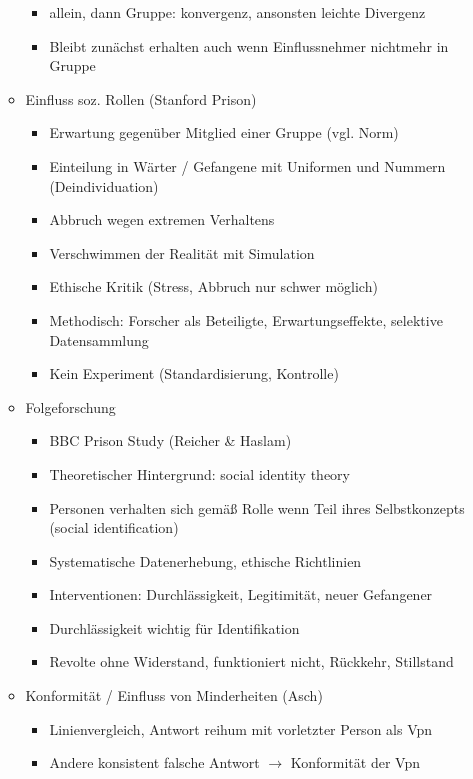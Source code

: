 \documentclass[11pt, paper=a4, twocolumn]{scrartcl}
\begin{document}
\begin{itemize}
\begin{itemize}
\begin{itemize}
							\item allein, dann Gruppe: konvergenz, ansonsten leichte Divergenz
							\item Bleibt zunächst erhalten auch wenn Einflussnehmer nichtmehr in Gruppe
						\end{itemize}
					\item Einfluss soz. Rollen (Stanford Prison)
						\begin{itemize}
							\item Erwartung gegenüber Mitglied einer Gruppe (vgl. Norm)
							\item Einteilung in Wärter / Gefangene mit Uniformen und Nummern (Deindividuation)
							\item Abbruch wegen extremen Verhaltens
							\item Verschwimmen der Realität mit Simulation
							\item Ethische Kritik (Stress, Abbruch nur schwer möglich)
							\item Methodisch: Forscher als Beteiligte, Erwartungseffekte, selektive Datensammlung
							\item Kein Experiment (Standardisierung, Kontrolle)
						\end{itemize}
					\item Folgeforschung
						\begin{itemize}
							\item BBC Prison Study (Reicher \& Haslam)
							\item Theoretischer Hintergrund: social identity theory
							\item Personen verhalten sich gemäß Rolle wenn Teil ihres Selbstkonzepts (social identification)
							\item Systematische Datenerhebung, ethische Richtlinien
							\item Interventionen: Durchlässigkeit, Legitimität, neuer Gefangener
							\item Durchlässigkeit wichtig für Identifikation
							\item Revolte ohne Widerstand, funktioniert nicht, Rückkehr, Stillstand
						\end{itemize}
					\item Konformität / Einfluss von Minderheiten (Asch)
						\begin{itemize}
							\item Linienvergleich, Antwort reihum mit vorletzter Person als Vpn
							\item Andere konsistent falsche Antwort $\rightarrow$ Konformität der Vpn

\end{itemize}
\end{itemize}
\end{itemize}
\end{document}
